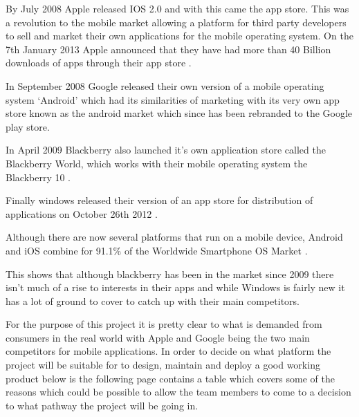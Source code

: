 By July 2008 Apple released IOS 2.0 and with this came the app store. This was a revolution to the mobile market allowing a platform for third party developers to sell and market their own applications for the mobile operating system. On the 7th January 2013 Apple announced that they have had more than 40 Billion downloads of apps through their app store \citep{40billion12}.

In September 2008 Google released their own version of a mobile operating system ‘Android’ which had its similarities of marketing with its very own app store known as the android market which since has been rebranded to the Google play store. 

In April 2009 Blackberry also launched it’s own application store called the Blackberry World, which works with their mobile operating system the Blackberry 10 \citep{bbworld09}.

Finally windows released their version of an app store for distribution of applications on October 26th 2012 \citep{windows8}.

Although there are now several platforms that run on a mobile device, Android and iOS combine for 91.1\% of the Worldwide Smartphone OS Market \citep{idc13}.

This shows that although blackberry has been in the market since 2009 there isn’t much of a rise to interests in their apps and while Windows is fairly new it has a lot of ground to cover to catch up with their main competitors.

For the purpose of this project it is pretty clear to what is demanded from consumers in the real world with Apple and Google being the two main competitors for mobile applications. In order to decide on what platform the project will be suitable for to design, maintain and deploy a good working product below is the following page contains a table which covers some of the reasons which could be possible to allow the team members to come to a decision to what pathway the project will be going in.

